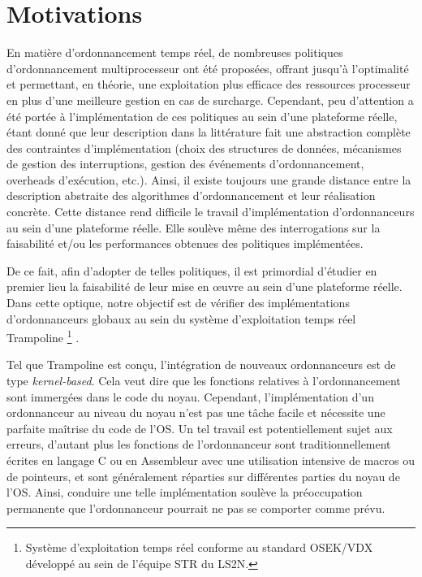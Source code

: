 %

\section{Motivations}

En matière d'ordonnancement temps réel, de nombreuses  politiques d'ordonnancement multiprocesseur ont été proposées, offrant jusqu'à l’optimalité et permettant, en théorie, une exploitation plus efficace des ressources processeur en plus d’une meilleure gestion en cas de surcharge. Cependant, peu d'attention a été portée à l'implémentation de ces politiques au sein d'une plateforme réelle, étant donné que leur description dans la littérature fait une abstraction complète des contraintes d'implémentation (choix des structures de données, mécanismes de gestion des interruptions, gestion des événements d'ordonnancement, overheads d'exécution, etc.). Ainsi, il existe toujours une grande distance entre la description abstraite des algorithmes d'ordonnancement et leur réalisation concrète. Cette distance rend difficile le travail d'implémentation d'ordonnanceurs au sein d'une plateforme réelle. Elle soulève même des interrogations sur la faisabilité et/ou les performances obtenues  des politiques implémentées. 

De ce fait, afin d'adopter de telles politiques, il est primordial d'étudier en premier lieu la faisabilité de leur mise en œuvre au sein d'une plateforme réelle. Dans cette optique, notre objectif est de vérifier des implémentations d'ordonnanceurs globaux au sein du système d'exploitation temps réel Trampoline \footnote{Système d'exploitation temps réel conforme au standard OSEK/VDX développé au sein de l'équipe STR du LS2N.} \cite{bechennec2006trampoline}.

Tel que Trampoline est conçu, l'intégration de nouveaux ordonnanceurs est de type \textit{kernel-based}. Cela veut dire que les fonctions relatives à l'ordonnancement sont immergées dans le code du noyau. Cependant, l'implémentation d'un ordonnanceur au niveau du noyau n'est pas une tâche facile et nécessite une parfaite maîtrise du code de l'OS. Un tel travail est potentiellement sujet aux erreurs, d'autant plus les fonctions de l'ordonnanceur sont traditionnellement écrites en langage C ou en Assembleur avec une utilisation intensive de macros ou de pointeurs, et sont généralement réparties sur différentes parties du noyau de l'OS. Ainsi, conduire une telle implémentation soulève la préoccupation permanente que l'ordonnanceur pourrait ne pas se comporter comme prévu.


